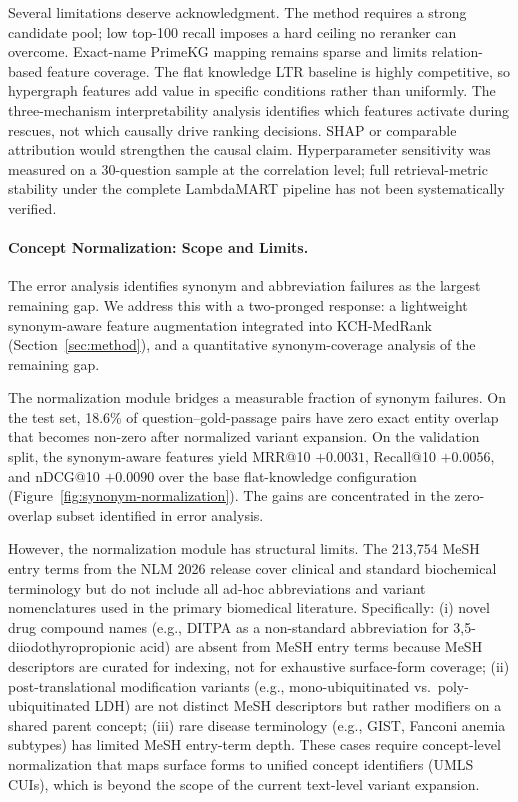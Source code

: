 Several limitations deserve acknowledgment. The method requires a strong candidate pool; low top-100 recall imposes a hard ceiling no reranker can overcome. Exact-name PrimeKG mapping remains sparse and limits relation-based feature coverage. The flat knowledge LTR baseline is highly competitive, so hypergraph features add value in specific conditions rather than uniformly. The three-mechanism interpretability analysis identifies which features activate during rescues, not which causally drive ranking decisions. SHAP or comparable attribution would strengthen the causal claim. Hyperparameter sensitivity was measured on a 30-question sample at the correlation level; full retrieval-metric stability under the complete LambdaMART pipeline has not been systematically verified.

\paragraph{Concept Normalization: Scope and Limits.}
The error analysis identifies synonym and abbreviation failures as the largest remaining gap. We address this with a two-pronged response: a lightweight synonym-aware feature augmentation integrated into KCH-MedRank (Section~\ref{sec:method}), and a quantitative synonym-coverage analysis of the remaining gap.

The normalization module bridges a measurable fraction of synonym failures. On the test set, 18.6\% of question--gold-passage pairs have zero exact entity overlap that becomes non-zero after normalized variant expansion. On the validation split, the synonym-aware features yield MRR@10 $+0.0031$, Recall@10 $+0.0056$, and nDCG@10 $+0.0090$ over the base flat-knowledge configuration (Figure~\ref{fig:synonym-normalization}). The gains are concentrated in the zero-overlap subset identified in error analysis.

However, the normalization module has structural limits. The 213,754 MeSH entry terms from the NLM 2026 release cover clinical and standard biochemical terminology but do not include all ad-hoc abbreviations and variant nomenclatures used in the primary biomedical literature. Specifically: (i) novel drug compound names (e.g., DITPA as a non-standard abbreviation for 3,5-diiodothyropropionic acid) are absent from MeSH entry terms because MeSH descriptors are curated for indexing, not for exhaustive surface-form coverage; (ii) post-translational modification variants (e.g., mono-ubiquitinated vs.\ poly-ubiquitinated LDH) are not distinct MeSH descriptors but rather modifiers on a shared parent concept; (iii) rare disease terminology (e.g., GIST, Fanconi anemia subtypes) has limited MeSH entry-term depth. These cases require concept-level normalization that maps surface forms to unified concept identifiers (UMLS CUIs), which is beyond the scope of the current text-level variant expansion.

